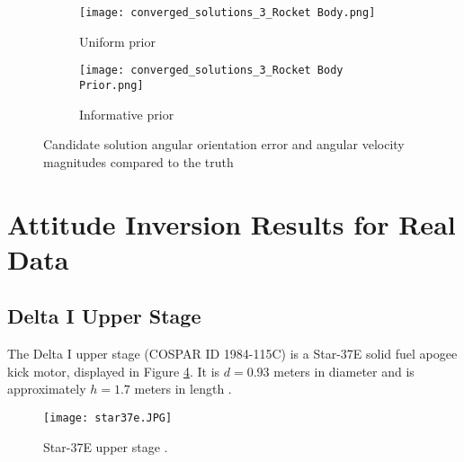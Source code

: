 \documentclass[a4paper,twocolumn]{spaceDebrisC} %
\newcommand{\figsmall}[0]{0.3\textwidth}
\begin{document}
\begin{figure}[H]
  \centering
  \begin{subfigure}[t]{0.23\textwidth}
    \centering
    \texttt{[image: converged\_solutions\_3\_Rocket Body.png]}
    \caption{Uniform prior}
    \label{fig:w_vs_ang_error_sols1a}
  \end{subfigure}
  \hfill
  \begin{subfigure}[t]{0.23\textwidth}
    \centering
    \texttt{[image: converged\_solutions\_3\_Rocket Body Prior.png]}
    \caption{Informative prior}
    \label{fig:w_vs_ang_error_sols1b}
  \end{subfigure}

  \caption{Candidate solution angular orientation error and angular velocity magnitudes compared to the truth}
  \label{fig:w_vs_ang_error_sols1}
\end{figure}




\section{Attitude Inversion Results for Real Data}


\subsection{Delta I Upper Stage}

The Delta I upper stage (COSPAR ID 1984-115C) is a Star-37E \cite{delta3914_astronautix} solid fuel apogee kick motor, displayed in Figure \ref{fig:star37e}. It is $d=0.93$ meters in diameter and is approximately $h=1.7$ meters in length \cite{star37e_astronautix, star37_gunter}.

\begin{figure}[H]
  \centering
  \texttt{[image: star37e.JPG]}
  \caption{Star-37E upper stage \cite{star37_af}.}
  \label{fig:star37e}
\end{figure}
\end{document}
